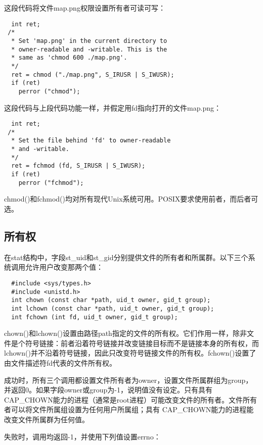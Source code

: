 这段代码将文件map.png权限设置所有者可读可写：

\begin{lstlisting}
  int ret;
 /*
  * Set 'map.png' in the current directory to
  * owner-readable and -writable. This is the
  * same as 'chmod 600 ./map.png'.
  */
  ret = chmod ("./map.png", S_IRUSR | S_IWUSR);
  if (ret)
    perror ("chmod");
\end{lstlisting}

这段代码与上段代码功能一样，并假定用fd指向打开的文件map.png：

\begin{lstlisting}
  int ret;
 /*
  * Set the file behind 'fd' to owner-readable
  * and -writable.
  */
  ret = fchmod (fd, S_IRUSR | S_IWUSR);
  if (ret)
    perror ("fchmod");
\end{lstlisting}

chmod()和fchmod()均对所有现代Unix系统可用。POSIX要求使用前者，而后者可选。 

\subsection{所有权}

在stat结构中，字段st\_uid和st\_gid分别提供文件的所有者和所属群。以下三个系统调用允许用户改变那两个值：

\begin{lstlisting}
  #include <sys/types.h>
  #include <unistd.h>
  int chown (const char *path, uid_t owner, gid_t group);
  int lchown (const char *path, uid_t owner, gid_t group);
  int fchown (int fd, uid_t owner, gid_t group);
\end{lstlisting}

chown()和lchown()设置由路径path指定的文件的所有权。它们作用一样，除非文件是个符号链接：前者沿着符号链接并改变链接目标而不是链接本身的所有权，而lchown()并不沿着符号链接，因此只改变符号链接文件的所有权。fchown()设置了由文件描述符fd代表的文件所有权。 

成功时，所有三个调用都设置文件所有者为owner，设置文件所属群组为group，并返回0。如果字段owner或group为-1，说明值没有设定。只有具有CAP\_CHOWN能力的进程（通常是root进程）可能改变文件的所有者。文件所有者可以将文件所属组设置为任何用户所属组；具有 CAP\_CHOWN能力的进程能改变文件所属群为任何值。 

失败时，调用均返回-1，并使用下列值设置errno：

